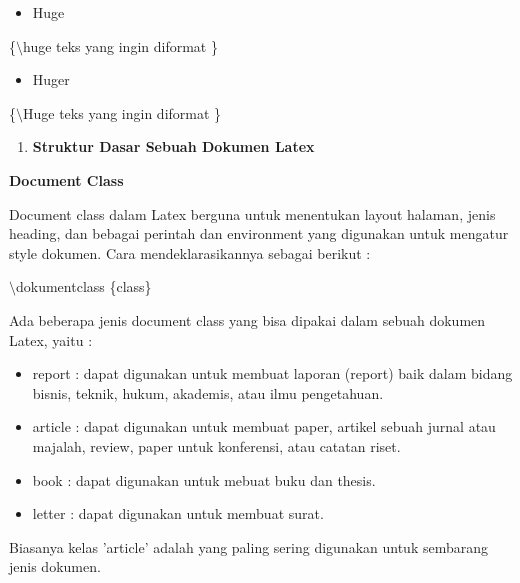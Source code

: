 \begin{itemize}
\item Huge
\end{itemize}
\hspace{0,5in}\{$\setminus$huge teks yang ingin diformat \}

\begin{itemize}
\item Huger
\end{itemize}
\hspace{0,5in}\{$\setminus$Huge teks yang ingin diformat \}

\begin{enumerate}
\setcounter{enumi}{\thenumberedCntB}
\item \textbf{Struktur Dasar Sebuah Dokumen Latex}
\setcounter{numberedCntB}{\theenumi}
\end{enumerate}
\textbf{Document Class}\par \vspace{12pt}

Document class dalam Latex berguna untuk menentukan layout halaman, jenis heading, dan bebagai perintah dan environment yang digunakan untuk mengatur style dokumen. Cara mendeklarasikannya sebagai berikut :\par \vspace{12pt}

$\setminus$dokumentclass \{class\}\par \vspace{12pt}

Ada beberapa jenis document class yang bisa dipakai dalam sebuah dokumen Latex, yaitu :

\begin{itemize}
\item report : dapat digunakan untuk membuat laporan (report) baik dalam bidang bisnis, teknik, hukum, akademis, atau ilmu pengetahuan.
\item article : dapat digunakan untuk membuat paper, artikel sebuah jurnal atau majalah, review, paper untuk konferensi, atau catatan riset.
\item book : dapat digunakan untuk mebuat buku dan thesis.
\item letter : dapat digunakan untuk membuat surat.
\end{itemize}
\hspace{0,5in}Biasanya kelas 'article' adalah yang paling sering digunakan untuk sembarang jenis dokumen.\par \vspace{12pt}



